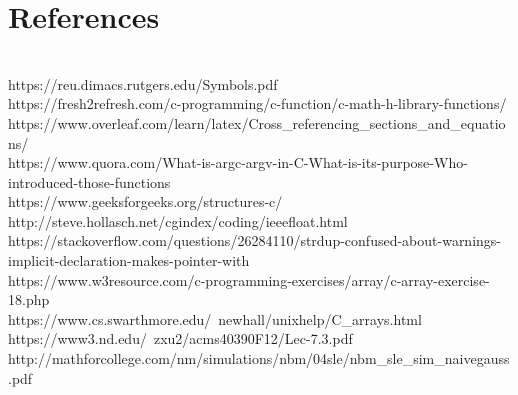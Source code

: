 \documentclass[11pt]{report}
\begin{document}
\section{References}
\\ https://reu.dimacs.rutgers.edu/Symbols.pdf
\\ https://fresh2refresh.com/c-programming/c-function/c-math-h-library-functions/
\\ https://www.overleaf.com/learn/latex/Cross\_referencing\_sections\_and\_equations/
\\ https://www.quora.com/What-is-argc-argv-in-C-What-is-its-purpose-Who-introduced-those-functions
\\ https://www.geeksforgeeks.org/structures-c/
\\ http://steve.hollasch.net/cgindex/coding/ieeefloat.html
\\ https://stackoverflow.com/questions/26284110/strdup-confused-about-warnings-implicit-declaration-makes-pointer-with
\\https://www.w3resource.com/c-programming-exercises/array/c-array-exercise-18.php
\\https://www.cs.swarthmore.edu/~newhall/unixhelp/C\_arrays.html
\\https://www3.nd.edu/~zxu2/acms40390F12/Lec-7.3.pdf
\\http://mathforcollege.com/nm/simulations/nbm/04sle/nbm\_sle\_sim\_naivegauss.pdf
\end{document}
